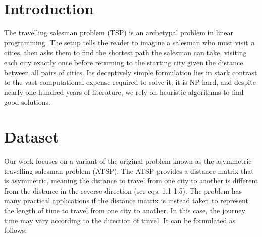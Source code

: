 \documentclass[12pt]{article}
\numberwithin{equation}{section}
\begin{document}
\tableofcontents
\vspace{1cm}
\listoffigures
\listoftables
\pagebreak

\newpage

\section{Introduction}

The travelling salesman problem (TSP) is an archetypal problem in linear programming. The setup tells the reader to imagine a salesman who must visit \textit{n} cities, then asks them to find the shortest path the salesman can take, visiting each city exactly once before returning to the starting city given the distance between all pairs of cities. Its deceptively simple formulation lies in stark contrast to the vast computational expense required to solve it; it is NP-hard, and despite nearly one-hundred years of literature, we rely on heuristic algorithms to find good solutions. 

\section{Dataset}



Our work focuses on a variant of the original problem known as the asymmetric travelling salesman problem (ATSP). The ATSP provides a distance matrix that is asymmetric, meaning the distance to travel from one city to another is different from the distance in the reverse direction (see eqs. 1.1-1.5). The problem has many practical applications if the distance matrix is instead taken to represent the length of time to travel from one city to another. In this case, the journey time may vary according to the direction of travel. It can be formulated as follows: 
\end{document}
